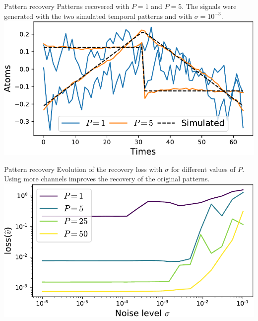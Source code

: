 \documentclass{beamer}
\begin{document}


\begin{frame}{Pattern recovery}
Patterns recovered with $P = 1$ and $P=5$. The signals were generated with the two simulated temporal patterns and with  $\sigma = 10^{-3}$. \\[1em]
\includegraphics[width=\textwidth]{1D_vs_multi_uv_hat_P5.pdf}
\end{frame}
\begin{frame}{Pattern recovery}
Evolution of the recovery loss with $\sigma$ for different values of $P$. Using more channels improves the recovery of the original patterns.\\[1em]
\includegraphics[width=\textwidth]{1D_vs_multi.pdf}
\end{frame}
\end{document}

